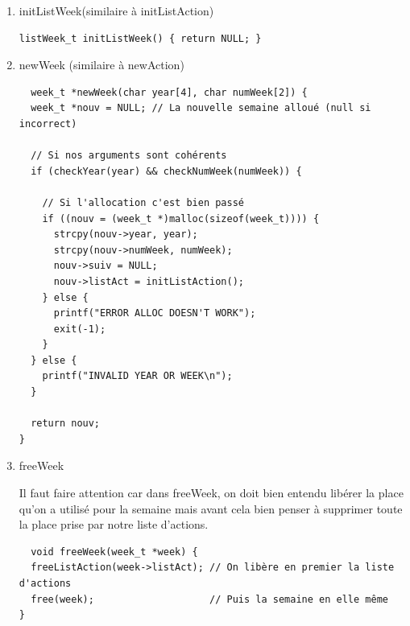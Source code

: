 \documentclass[11pt]{article}
\begin{document}
\begin{enumerate}
\item initListWeek(similaire à initListAction)
\label{sec:org44b85cb}

\begin{lstlisting}
listWeek_t initListWeek() { return NULL; }
\end{lstlisting}


\item newWeek (similaire à newAction)
\label{sec:orgcd18834}

\begin{lstlisting}
  week_t *newWeek(char year[4], char numWeek[2]) {
  week_t *nouv = NULL; // La nouvelle semaine alloué (null si incorrect)

  // Si nos arguments sont cohérents
  if (checkYear(year) && checkNumWeek(numWeek)) {

    // Si l'allocation c'est bien passé
    if ((nouv = (week_t *)malloc(sizeof(week_t)))) {
      strcpy(nouv->year, year);
      strcpy(nouv->numWeek, numWeek);
      nouv->suiv = NULL;
      nouv->listAct = initListAction();
    } else {
      printf("ERROR ALLOC DOESN'T WORK");
      exit(-1);
    }
  } else {
    printf("INVALID YEAR OR WEEK\n");
  }

  return nouv;
}
\end{lstlisting}


\item freeWeek
\label{sec:org2e45ffc}

Il faut faire attention car dans freeWeek, on doit bien entendu libérer la
place qu'on a utilisé pour la semaine mais avant cela bien penser à
supprimer toute la place prise par notre liste d'actions.

\begin{lstlisting}
  void freeWeek(week_t *week) {
  freeListAction(week->listAct); // On libère en premier la liste d'actions
  free(week);                    // Puis la semaine en elle même
}


\end{lstlisting}
\end{enumerate}
\end{document}
